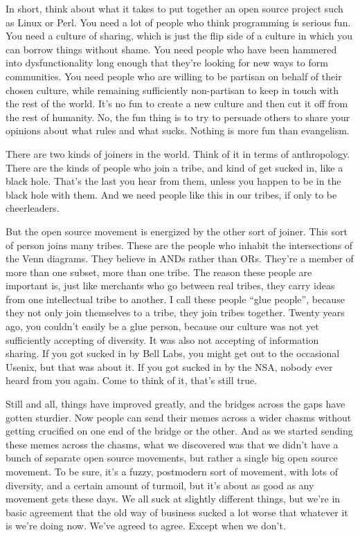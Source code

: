In short, think about what it takes to put together an open source project
such as Linux or Perl. You need a lot of people who think programming is
serious fun. You need a culture of sharing, which is just the flip side of a
culture in which you can borrow things without shame. You need people who
have been hammered into dysfunctionality long enough that they're looking for
new ways to form communities. You need people who are willing to be partisan
on behalf of their chosen culture, while remaining sufficiently non-partisan
to keep in touch with the rest of the world. It's no fun to create a new
culture and then cut it off from the rest of humanity. No, the fun thing is
to try to persuade others to share your opinions about what rules and what
sucks. Nothing is more fun than evangelism.

There are two kinds of joiners in the world. Think of it in terms of
anthropology. There are the kinds of people who join a tribe, and kind of get
sucked in, like a black hole. That's the last you hear from them, unless you
happen to be in the black hole with them. And we need people like this in our
tribes, if only to be cheerleaders.

But the open source movement is energized by the other sort of joiner. This
sort of person joins many tribes. These are the people who inhabit the
intersections of the Venn diagrams. They believe in ANDs rather than ORs.
They're a member of more than one subset, more than one tribe. The reason
these people are important is, just like merchants who go between real
tribes, they carry ideas from one intellectual tribe to another. I call these
people ``glue people'', because they not only join themselves to a tribe,
they join tribes together. Twenty years ago, you couldn't easily be a glue
person, because our culture was not yet sufficiently accepting of diversity.
It was also not accepting of information sharing. If you got sucked in by
Bell Labs, you might get out to the occasional Usenix, but that was about it.
If you got sucked in by the NSA, nobody ever heard from you again. Come to
think of it, that's still true.

Still and all, things have improved greatly, and the bridges across the gaps
have gotten sturdier. Now people can send their memes across a wider chasms
without getting crucified on one end of the bridge or the other. And as we
started sending these memes across the chasms, what we discovered was that we
didn't have a bunch of separate open source movements, but rather a single
big open source movement. To be sure, it's a fuzzy, postmodern sort of
movement, with lots of diversity, and a certain amount of turmoil, but it's
about as good as any movement gets these days. We all suck at slightly
different things, but we're in basic agreement that the old way of business
sucked a lot worse that whatever it is we're doing now. We've agreed to
agree. Except when we don't.

